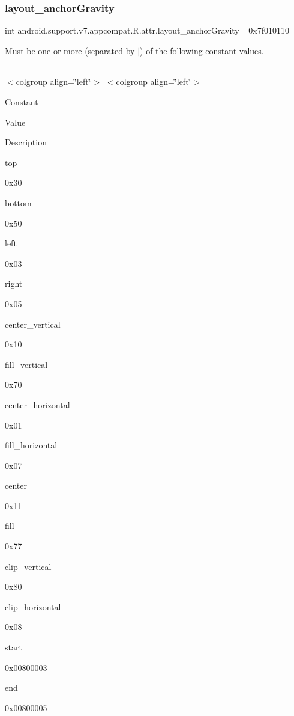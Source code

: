 \subsubsection{\texorpdfstring{layout\+\_\+anchor\+Gravity}{layout\_anchorGravity}}
{\footnotesize\ttfamily int android.\+support.\+v7.\+appcompat.\+R.\+attr.\+layout\+\_\+anchor\+Gravity =0x7f010110\hspace{0.3cm}{\ttfamily [static]}}

Must be one or more (separated by \textquotesingle{}$\vert$\textquotesingle{}) of the following constant values.

\tabulinesep=1mm
\begin{longtabu} spread 0pt [c]{*{0}{|X[-1]}|}
\hline
\end{longtabu}
$<$colgroup align=\char`\"{}left\char`\"{}$>$ $<$colgroup align=\char`\"{}left\char`\"{}$>$ 

Constant

Value

Description 

{\ttfamily top}

0x30

{\ttfamily bottom}

0x50

{\ttfamily left}

0x03

{\ttfamily right}

0x05

{\ttfamily center\+\_\+vertical}

0x10

{\ttfamily fill\+\_\+vertical}

0x70

{\ttfamily center\+\_\+horizontal}

0x01

{\ttfamily fill\+\_\+horizontal}

0x07

{\ttfamily center}

0x11

{\ttfamily fill}

0x77

{\ttfamily clip\+\_\+vertical}

0x80

{\ttfamily clip\+\_\+horizontal}

0x08

{\ttfamily start}

0x00800003

{\ttfamily end}

0x00800005\mbox{\label{classandroid_1_1support_1_1v7_1_1appcompat_1_1R_1_1attr_a00932b370ca0c3682e18c8d9ab07da5b}} 
